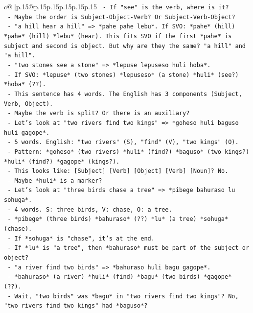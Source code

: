 \documentclass{article}
\begin{document}
{\begin{supertabular}{c@{$\;$}|p{.15\linewidth}@{}p{.15\linewidth}p{.15\linewidth}p{.15\linewidth}p{.15\linewidth}p{.15\linewidth}}
{{{\texttt{  {-} If "see" is the verb, where is it?} \\
\texttt{  {-} Maybe the order is Subject{-}Object{-}Verb? Or Subject{-}Verb{-}Object?} \\
\texttt{  {-} "a hill hear a hill" => *pahe pahe lebu*. If SVO: *pahe* (hill) *pahe* (hill) *lebu* (hear). This fits SVO if the first *pahe* is subject and second is object. But why are they the same? "a hill" and "a hill".} \\
\texttt{  {-} "two stones see a stone" => *lepuse lepuseso huli hoba*.} \\
\texttt{    {-} If SVO: *lepuse* (two stones) *lepuseso* (a stone) *huli* (see?) *hoba* (??).} \\
\texttt{    {-} This sentence has 4 words. The English has 3 components (Subject, Verb, Object).} \\
\texttt{    {-} Maybe the verb is split? Or there is an auxiliary?} \\
\texttt{    {-} Let's look at "two rivers find two kings" => *goheso huli baguso huli gagope*.} \\
\texttt{      {-} 5 words. English: "two rivers" (S), "find" (V), "two kings" (O).} \\
\texttt{      {-} Pattern: *goheso* (two rivers) *huli* (find?) *baguso* (two kings?) *huli* (find?) *gagope* (kings?).} \\
\texttt{      {-} This looks like: {[}Subject{]} {[}Verb{]} {[}Object{]} {[}Verb{]} {[}Noun{]}? No.} \\
\texttt{      {-} Maybe *huli* is a marker?} \\
\texttt{      {-} Let's look at "three birds chase a tree" => *pibege bahuraso lu sohuga*.} \\
\texttt{        {-} 4 words. S: three birds, V: chase, O: a tree.} \\
\texttt{        {-} *pibege* (three birds) *bahuraso* (??) *lu* (a tree) *sohuga* (chase).} \\
\texttt{        {-} If *sohuga* is "chase", it's at the end.} \\
\texttt{        {-} If *lu* is "a tree", then *bahuraso* must be part of the subject or object?} \\
\texttt{        {-} "a river find two birds" => *bahuraso huli bagu gagope*.} \\
\texttt{          {-} *bahuraso* (a river) *huli* (find) *bagu* (two birds) *gagope* (??).} \\
\texttt{          {-} Wait, "two birds" was *bagu* in "two rivers find two kings"? No, "two rivers find two kings" had *baguso*?} \\
}}}
\end{supertabular}}
\end{document}
